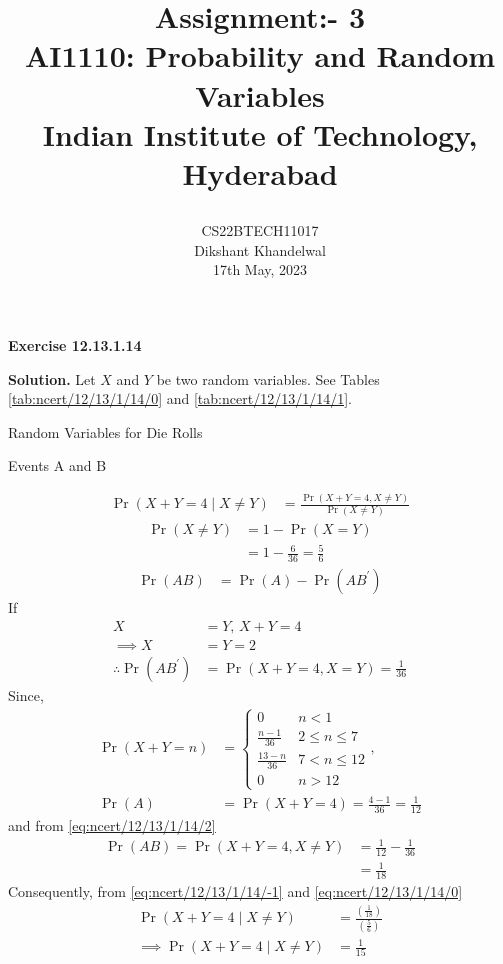 \documentclass[journal,12pt,twocolumn]{IEEEtran}
\title{

  Assignment:- 3\\
  \Large AI1110: Probability and Random Variables\\
  \Large Indian Institute of Technology, Hyderabad
}
\author{
  CS22BTECH11017\\[4pt]
  Dikshant Khandelwal\\
  17th May, 2023
}
\providecommand{\pr}[1]{\ensuremath{\Pr\left(#1\right)}}
\providecommand{\brak}[1]{\ensuremath{\left(#1\right)}}
\theoremstyle{remark}
\providecommand{\cond}[2]{#1\middle|#2}
\begin{document}
%

\maketitle

\textbf{Exercise 12.13.1.14}

\textbf{Solution.} Let $X$ and $Y$ be two random variables.
\fi
See Tables
    \ref{tab:ncert/12/13/1/14/0}
    and
    \ref{tab:ncert/12/13/1/14/1}.
\begin{table}[h]
    
    \caption{Random Variables for Die Rolls}
    \label{tab:ncert/12/13/1/14/0}
   \end{table}
\begin{table}[h]
  
  \caption{Events A and B}
  \label{tab:ncert/12/13/1/14/1}
 \end{table}
%
\begin{align}
    \pr{\cond{X+Y = 4}{X \neq Y}} &= \frac{\pr{X+Y = 4,X \neq Y}}{\pr{X\neq Y}}
  \label{eq:ncert/12/13/1/14/-1}
\end{align}
%
\begin{align}
    \pr{X\neq Y} &= 1 - \pr{X = Y}\\
    &= 1 - \frac{6}{36}
    = \frac{5}{6}
  \label{eq:ncert/12/13/1/14/0}
\end{align}
%
\begin{align}
       \pr{AB}  &= \pr{A}-\pr{AB^{\prime}}
  \label{eq:ncert/12/13/1/14/1}
\end{align}
If
\begin{align}
	X &= Y,\,
 X+Y = 4\\
\implies X &= Y =2\\
  \therefore  \pr{AB^{\prime}} &= \pr{X+Y = 4,X = Y} = \frac{1}{36}
  \label{eq:ncert/12/13/1/14/2}
\end{align}
Since,
\begin{align}
\pr{X+Y = n} &= 
\begin{cases}
0 & n < 1
\\
\frac{n-1}{36} &  2 \le n \le  7
\\
\frac{13-n}{36} & 7 < n \le 12
\\
0 & n > 12
\end{cases},
\\
	\pr{A} &= \pr{X+Y = 4} = \frac{4-1}{36} = \frac{1}{12}
\end{align}
and from 
  \eqref{eq:ncert/12/13/1/14/2}
\begin{align}
    \pr{AB} = \pr{X + Y = 4 , X \ne Y} &= \frac{1}{12} - \frac{1}{36}\\
                        &= \frac{1}{18}
\end{align}
Consequently, 
from 
  \eqref{eq:ncert/12/13/1/14/-1}
  and 
  \eqref{eq:ncert/12/13/1/14/0}
\begin{align}
  \pr{\cond{X+Y = 4}{X \neq Y}} &= \frac{\brak{\frac{1}{18}}}{\brak{\frac{5}{6}}}\\
\implies \pr{\cond{X+Y = 4}{X \neq Y}} &= \frac{1}{15}
\end{align}
\end{document}
